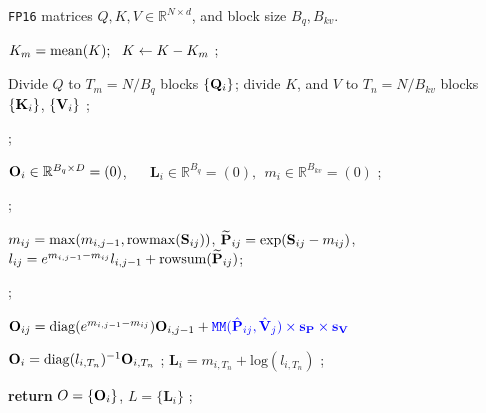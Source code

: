 \begin{algorithm}[H]
    \small
    \caption{Forward pass of the \texttt{8-bit} attention.}
    \label{alg:int8_train_fwd} 
    \begin{algorithmic}[1]
     {\texttt{FP16} matrices $Q, K, V \in \mathbb{R}^{N \times d}$, and block size $B_q, B_{kv}$.}

    \STATE $K_m = {\rm mean}(K); ~~ K\gets K-K_m$ ; 
    
    \STATE Divide $Q$ to $T_m = {N}/{B_q}$ blocks $\{\mathbf{Q}_i\}$; divide $K$, and $V$ to $T_n = {N}/{B_{kv}}$ blocks $\{\mathbf{K}_i\}$, $\{\mathbf{V}_i\}$ ;  

      ; 


    \STATE $\mathbf{O}_i \in \mathbb{R}^{B_q\times D}= (0)$, ~~ $\mathbf{L}_i \in \mathbb{R}^{B_q} = (0),~~ m_i \in \mathbb{R}^{B_{kv}} = (0)$ ;


            \STATE {} ;  

            \STATE $m_{ij} = \mathrm{max}(m_{i,j-1}, \mathrm{rowmax}(\mathbf{S}_{ij}))$, $\widetilde {\mathbf{P}}_{ij} = \mathrm{exp}(\mathbf{S}_{ij} - m_{ij})$, $l_{ij} = e^{m_{i,j-1}-m_{ij}} l_{i,j-1} + \mathrm{rowsum}(\widetilde {\mathbf{P}}_{ij})$;

            \STATE {} ; 

            \STATE $\mathbf{O}_{ij} = \mathrm{diag}(e^{m_{i,j-1}-m_{ij}}) \mathbf{O}_{i,j-1} + \textcolor{blue}{{\texttt{MM}(\hat {\mathbf{P}}_{ij}, \hat {\mathbf{V}}_j) \times \mathbf{s_{P}} \times \mathbf{s_V}}}$
        
        \ENDFOR
        \STATE $\mathbf{O}_i = \mathrm{diag}(l_{i,T_n}) ^{-1} \mathbf{O}_{i,T_n}$ ;  %
        \STATE $\mathbf{L}_i = m_{i, T_n} + \mathrm{log}(l_{i, T_n})$ ; %
    \ENDFOR
    
    \STATE \textbf{return} $O = \{\mathbf{O}_i\}$, $L = \{\mathbf{L}_i\}$ ;
    \end{algorithmic}
    \vspace{-.15em}
\end{algorithm}

